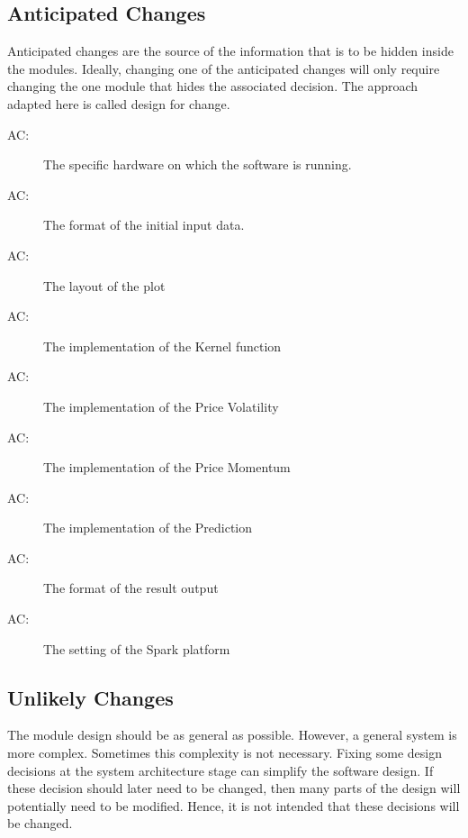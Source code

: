 \documentclass[12pt, titlepage]{article}
\newcounter{acnum}
\newcommand{\actheacnum}{AC\theacnum}
\begin{document}
\subsection{Anticipated Changes} \label{SecAchange}

Anticipated changes are the source of the information that is to be hidden
inside the modules. Ideally, changing one of the anticipated changes will only
require changing the one module that hides the associated decision. The approach
adapted here is called design for
change.

\begin{description}
\item[ \actheacnum \label{AC1}:] The specific
hardware on which the software is running.
\item[ \actheacnum \label{AC2}:] The format of the
initial input data.
\item[ \actheacnum \label{AC3}:] The layout of the plot
\item[ \actheacnum \label{AC4}:] The implementation of the Kernel function
\item[ \actheacnum \label{AC5}:] The implementation of the Price Volatility
\item[ \actheacnum \label{AC6}:] The implementation of the Price Momentum
\item[ \actheacnum \label{AC7}:] The implementation of the Prediction
\item[ \actheacnum \label{AC8}:] The format of the result output 
\item[ \actheacnum \label{AC9}:] The setting of the Spark platform
\end{description}

\subsection{Unlikely Changes} \label{SecUchange}

The module design should be as general as possible. However, a general system is
more complex. Sometimes this complexity is not necessary. Fixing some design
decisions at the system architecture stage can simplify the software design. If
these decision should later need to be changed, then many parts of the design
will potentially need to be modified. Hence, it is not intended that these
decisions will be changed.
\end{document}
